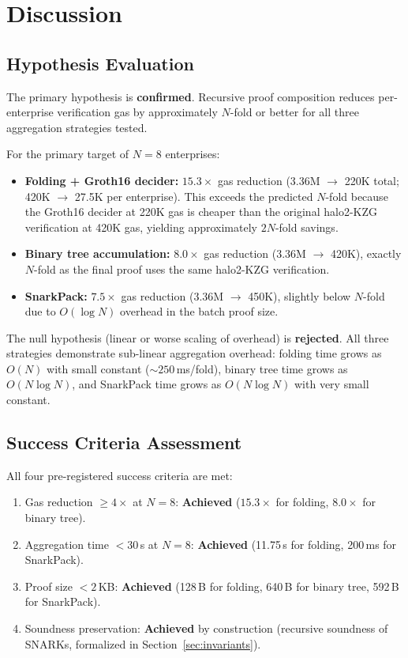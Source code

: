 \section{Discussion}
\label{sec:discussion}

\subsection{Hypothesis Evaluation}

The primary hypothesis is \textbf{confirmed}. Recursive proof
composition reduces per-enterprise verification gas by approximately
$N$-fold or better for all three aggregation strategies tested.

For the primary target of $N{=}8$ enterprises:

\begin{itemize}
  \item \textbf{Folding + Groth16 decider:} $15.3\times$ gas reduction
    (3.36M $\to$ 220K total; 420K $\to$ 27.5K per enterprise). This
    exceeds the predicted $N$-fold because the Groth16 decider at 220K
    gas is cheaper than the original halo2-KZG verification at 420K
    gas, yielding approximately $2N$-fold savings.
  \item \textbf{Binary tree accumulation:} $8.0\times$ gas reduction
    (3.36M $\to$ 420K), exactly $N$-fold as the final proof uses the
    same halo2-KZG verification.
  \item \textbf{SnarkPack:} $7.5\times$ gas reduction (3.36M $\to$
    450K), slightly below $N$-fold due to $O(\log N)$ overhead in the
    batch proof size.
\end{itemize}

The null hypothesis (linear or worse scaling of overhead) is
\textbf{rejected}. All three strategies demonstrate sub-linear
aggregation overhead: folding time grows as $O(N)$ with small constant
(${\sim}250$\,ms/fold), binary tree time grows as $O(N \log N)$, and
SnarkPack time grows as $O(N \log N)$ with very small constant.

\subsection{Success Criteria Assessment}

All four pre-registered success criteria are met:

\begin{enumerate}
  \item Gas reduction $\geq 4\times$ at $N{=}8$: \textbf{Achieved}
    ($15.3\times$ for folding, $8.0\times$ for binary tree).
  \item Aggregation time $< 30$\,s at $N{=}8$: \textbf{Achieved}
    (11.75\,s for folding, 200\,ms for SnarkPack).
  \item Proof size $< 2$\,KB: \textbf{Achieved} (128\,B for folding,
    640\,B for binary tree, 592\,B for SnarkPack).
  \item Soundness preservation: \textbf{Achieved} by construction
    (recursive soundness of SNARKs, formalized in
    Section~\ref{sec:invariants}).
\end{enumerate}

